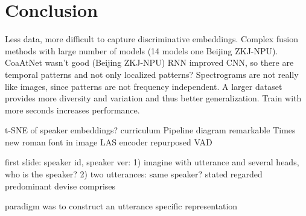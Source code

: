 \documentclass[conference]{IEEEtran}
\begin{document}
\section{Conclusion}

Less data, more difficult to capture discriminative embeddings. Complex fusion methods with large number of models (14 models one Beijing ZKJ-NPU). CoaAtNet wasn't good (Beijing ZKJ-NPU)
RNN improved CNN, so there are temporal patterns and not only localized patterns? Spectrograms are not really like images, since patterns are not frequency independent. A larger dataset provides more diversity and variation and thus better generalization. Train with more seconds increases performance.

t-SNE of speaker embeddings?
curriculum
Pipeline diagram
remarkable
Times new roman font in image
LAS encoder repurposed
VAD

first slide: speaker id, speaker ver: 1) imagine with utterance and several heads, who is the speaker? 2) two utterances: same speaker?
stated
regarded
predominant 
devise
comprises  

paradigm was to construct an utterance specific representation  



\end{document}
